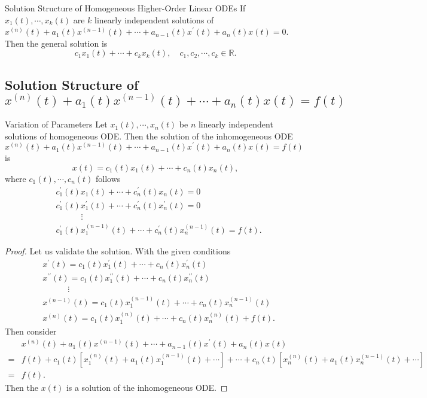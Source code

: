 \begin{proposition}{Solution Structure of Homogeneous Higher-Order Linear ODEs}{}
  If $x_1(t), \cdots, x_k(t)$ are $k$ linearly independent solutions of
  $x^{(n)}(t) + a_1(t)x^{(n-1)}(t) + \cdots + a_{n-1}(t)x^{\prime}(t) + a_n(t)x(t) = 0$.
  Then the general solution is
  \begin{equation}
    c_1x_1(t) + \cdots + c_kx_k(t), \quad c_1,c_2,\cdots,c_k \in \mathbb{R}.
  \end{equation}
\end{proposition}

\subsection{Solution Structure of $x^{(n)}(t) + a_1(t)x^{(n-1)}(t) + \cdots + a_n(t)x(t) = f(t)$}

\begin{proposition}{Variation of Parameters}{}
  Let $x_1(t), \cdots, x_n(t)$ be $n$ linearly independent solutions of homogeneous ODE.
  Then the solution of the inhomogeneous ODE
  $x^{(n)}(t) + a_1(t)x^{(n-1)}(t) + \cdots + a_{n-1}(t)x^{\prime}(t) + a_n(t)x(t) = f(t)$
  is
  \begin{equation}
    x(t) = c_1(t)x_1(t) + \cdots + c_n(t)x_n(t),
  \end{equation}
  where $c_1(t),\cdots,c_n(t)$ follows
  \begin{align}
    & c^{\prime}_1(t)x_1(t) + \cdots + c_n^{\prime}(t)x_n(t) = 0\\
    & c^{\prime}_1(t)x_1^{\prime}(t) + \cdots + c_n^{\prime}(t)x_n^{\prime}(t) = 0\\
    & \quad \quad \quad \vdots\\
    & c^{\prime}_1(t)x_1^{(n-1)}(t) + \cdots +  c_n^{\prime}(t)x_n^{(n-1)}(t) = f(t).
  \end{align}
\end{proposition}

\begin{proof}
  Let us validate the solution. With the given conditions
  \begin{align}
    & x^{\prime}(t) = c_1(t)x^{\prime}_1(t) + \cdots + c_n(t)x^{\prime}_n(t)\\
    & x^{\prime\prime}(t) = c_1(t)x^{\prime\prime}_1(t) + \cdots + c_n(t)x_n^{\prime\prime}(t)\\
    & \quad \quad \quad \vdots\\
    & x^{(n-1)}(t) = c_1(t)x_1^{(n-1)}(t) + \cdots + c_n(t) x_n^{(n-1)}(t)\\
    & x^{(n)}(t) = c_1(t)x_1^{(n)}(t) + \cdots + c_n(t) x_n^{(n)}(t) + f(t).
  \end{align}
  Then consider
  \begin{align}
    &x^{(n)}(t) + a_1(t)x^{(n-1)}(t) + \cdots + a_{n-1}(t)x^{\prime}(t) + a_n(t)x(t)\\
    =& f(t) + c_1(t)[x_1^{(n)}(t) + a_1(t) x_1^{(n-1)}(t) + \cdots] + \cdots + c_n(t)[x_n^{(n)}(t) + a_1(t)x_n^{(n-1)}(t) + \cdots]\\
    =& f(t).
  \end{align}
  Then the $x(t)$ is a solution of the inhomogeneous ODE.
\end{proof}

